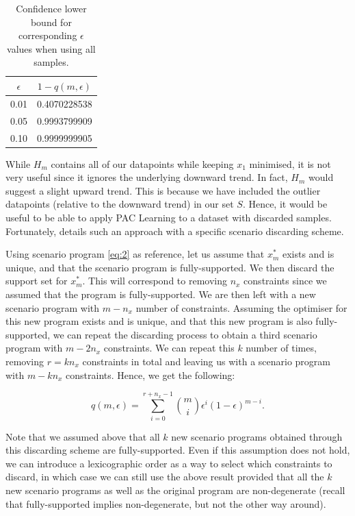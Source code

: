 \documentclass[11pt]{article}
\begin{document}
\begin{table}[]
\centering
\begin{tabular}{@{}cc@{}}
\toprule
\textbf{$\epsilon$} & \textbf{$1-q(m,\epsilon)$} \\ \midrule
0.01                & 0.4070228538               \\
0.05                & 0.9993799909               \\
0.10                & 0.9999999905               \\ \bottomrule
\end{tabular}
\caption{Confidence lower bound for corresponding $\epsilon$ values when using all samples.}
\label{tab:confidence}
\end{table}

While $H_{m}$ contains all of our datapoints while keeping $x_{1}$ minimised, it is not very useful since it ignores the underlying downward trend. In fact, $H_{m}$ would suggest a slight upward trend. This is because we have included the outlier datapoints (relative to the downward trend) in our set $S$. Hence, it would be useful to be able to apply PAC Learning to a dataset with discarded samples. Fortunately, \cite{kostas} details such an approach with a specific scenario discarding scheme.

Using scenario program \ref{eq:2} as reference, let us assume that $x^{*}_{m}$ exists and is unique, and that the scenario program is fully-supported. We then discard the support set for $x^{*}_{m}$. This will correspond to removing $n_{x}$ constraints since we assumed that the program is fully-supported. We are then left with a new scenario program with $m-n_{x}$ number of constraints. Assuming the optimiser for this new program exists and is unique, and that this new program is also fully-supported, we can repeat the discarding process to obtain a third scenario program with $m-2n_{x}$ constraints. We can repeat this $k$ number of times, removing $r=kn_{x}$ constraints in total and leaving us with a scenario program with $m-kn_{x}$ constraints. Hence, we get the following:

\begin{equation}
	\label{eq:6}
	q(m,\epsilon) = \sum_{i=0}^{r+n_{x}-1}{\binom{m}{i}}\epsilon^{i}(1-\epsilon)^{m-i}.
\end{equation}

Note that we assumed above that all $k$ new scenario programs obtained through this discarding scheme are fully-supported. Even if this assumption does not hold, we can introduce a lexicographic order as a way to select which constraints to discard, in which case we can still use the above result provided that all the $k$ new scenario programs as well as the original program are non-degenerate (recall that fully-supported implies non-degenerate, but not the other way around).
\end{document}
